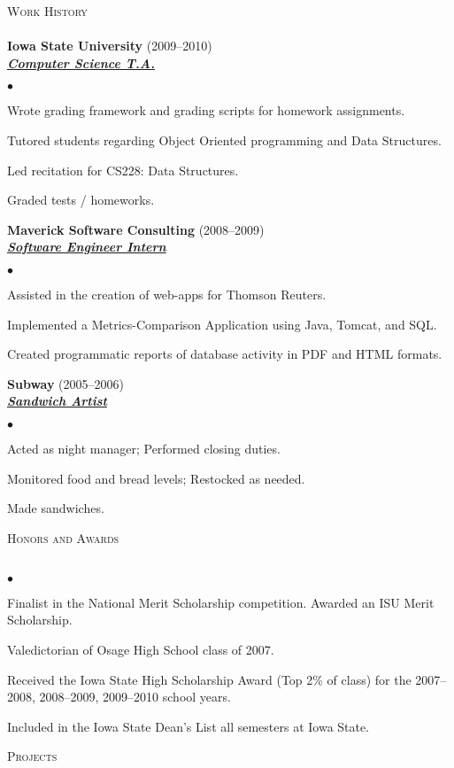 \documentclass{article}
\newcommand{\lineunder} {
	\vspace*{-8pt} \\ \hspace*{-18pt} \hrulefill \\
}
\newcommand{\header}[1] {
	{\hspace*{-15pt}\vspace*{6pt} \textsc{#1}} \vspace*{-6pt} \lineunder
}
\newcommand{\employer}[3] {
	{ \textbf{#1} (#2)\\ \underline{\textbf{\emph{#3}}}\\  }
}
\newenvironment{achievements} {
	\begin{list}{$\bullet$}
		{\topsep 0pt \itemsep -2pt}
	}{
		\vspace*{4pt}\end{list}
	}
\begin{document}
\header{Work History}

	\employer{Iowa State University}{2009--2010}{Computer Science T.A.}
		\begin{achievements}
			\item{Wrote grading framework and grading scripts for homework assignments.}
			\item{Tutored students regarding Object Oriented programming and Data Structures.}
			\item{Led recitation for CS228: Data Structures.}
			\item{Graded tests / homeworks.}
		\end{achievements}

	\employer{Maverick Software Consulting}{2008--2009}{Software Engineer Intern}
		\begin{achievements}
			\item{Assisted in the creation of web-apps for Thomson Reuters.}
			\item{Implemented a Metrics-Comparison Application using Java, Tomcat, and SQL.}
			\item{Created programmatic reports of database activity in PDF and HTML formats.}
		\end{achievements}

	\employer{Subway}{2005--2006}{Sandwich Artist}
		\begin{achievements}
			\item{Acted as night manager; Performed closing duties.}
			\item{Monitored food and bread levels; Restocked as needed.}
			\item{Made sandwiches.}
		\end{achievements}

\header{Honors and Awards}

	\begin{achievements}
		\item{Finalist in the National Merit Scholarship competition. Awarded an ISU Merit Scholarship.}
		\item{Valedictorian of Osage High School class of 2007.}
		\item{Received the Iowa State High Scholarship Award (Top 2\% of class) for the 2007--2008, 2008--2009, 2009--2010 school years.}
		\item{Included in the Iowa State Dean's List all semesters at Iowa State.}
	\end{achievements}

\header{Projects}
\end{document}

